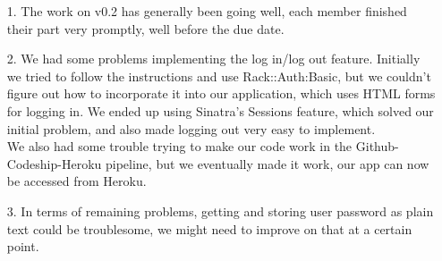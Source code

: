 \documentclass[12pt, a4paper]{article}
\begin{document}
\begin{enumerate}
	\item[1.]
	The work on v0.2 has generally been going well, each member finished their part very promptly, well before the due date.
	\item[2.]
	We had some problems implementing the log in/log out feature. Initially we tried to follow the instructions and use Rack::Auth:Basic, but we couldn't figure out how to incorporate it into our application, which uses HTML forms for logging in. We ended up using Sinatra's Sessions feature, which solved our initial problem, and also made logging out very easy to implement.\\
	We also had some trouble trying to make our code work in the Github-Codeship-Heroku pipeline, but we eventually made it work, our app can now be accessed from Heroku.
	\item[3.]
	In terms of remaining problems, getting and storing user password as plain text could be troublesome, we might need to improve on that at a certain point.
\end{enumerate}
\end{document}
